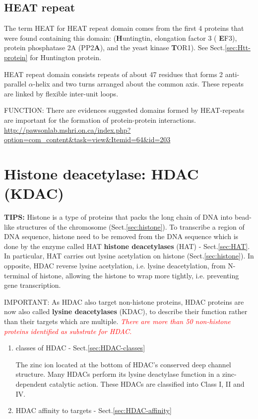 \subsection{HEAT repeat}
\label{sec:HEAT-repeat}

The term HEAT for HEAT repeat domain comes from the first 4 proteins that
were found containing this domain: ({\bf H}untingtin, elongation factor 3 ({\bf
E}F3), protein phosphatase 2A (PP2{\bf A}), and the yeast kinase {\bf T}OR1).
See Sect.\ref{sec:Htt-protein} for Huntington protein.

HEAT repeat domain consists repeats of about 47 residues that forms 2
anti-parallel $\alpha$-helix and two turns arranged about the common axis. These
repeats are linked by flexible inter-unit loops.

FUNCTION: There are evidences suggested domains formed by HEAT-repeats are
important for the formation of protein-protein interactions.
\url{http://pawsonlab.mshri.on.ca/index.php?option=com_content&task=view&Itemid=64&id=203}


\section{Histone deacetylase: HDAC (KDAC)}
\label{sec:HDAC}
\label{sec:KDAC}
\label{sec:Histone-deacetylase}

{\bf TIPS:} Histone is a type of proteins that packs the long chain of DNA into
bead-like structures of the chromosome (Sect.\ref{sec:histone}). To transcribe a
region of DNA sequence, histone need to be removed from the DNA sequence which
is done by the enzyme called HAT {\bf histone deacetylases} (HAT) -
Sect.\ref{sec:HAT}. In particular, HAT carries out lysine acetylation on histone
(Sect.\ref{sec:histone}). In opposite, HDAC reverse lysine acetylation, i.e.
lysine deacetylation, from N-terminal of histone, allowing the histone to wrap
more tightly, i.e. preventing gene transcription.


IMPORTANT: As HDAC also target non-histone proteins, HDAC proteins are now also
called {\bf lysine deacetylases} (KDAC), to describe their function rather than
their targets which are multiple. \textcolor{red}{\it There are more than 50
non-histone proteins identified as substrate for HDAC.}

\begin{enumerate}
  \item classes of HDAC - Sect.\ref{sec:HDAC-classes}

The zinc ion located at the bottom of HDAC's conserved deep channel structure.
Many HDACs perform its lysine deactylase function in a zinc-dependent catalytic
action. These HDACs are classified into Class I, II and IV. 
  
  \item HDAC affinity to targets - Sect.\ref{sec:HDAC-affinity}
\end{enumerate}

